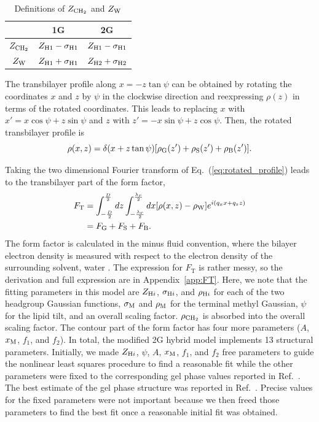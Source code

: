 \begin{table}[htbp]
  \centering
  \begin{tabular}{c c c}
    \hline
     & 1G & 2G \\
    \hline
    $Z_\mathrm{CH_2}$ & $Z_{\mathrm{H}1}-\sigma_{\mathrm{H}1}$ & $Z_{\mathrm{H}1}-\sigma_{\mathrm{H}1}$ \\
    $Z_\mathrm{W}$ & $Z_{\mathrm{H}1}+\sigma_{\mathrm{H}1}$ & $Z_{\mathrm{H}2}+\sigma_{\mathrm{H}2}$ \\
    \hline  
  \end{tabular}
  \caption{Definitions of $Z_\mathrm{CH_2}$ and $Z_\mathrm{W}$}
  \label{tab:zchtwozw}
\end{table}

The transbilayer profile along $x=-z\tan\psi$ can be obtained by rotating
the coordinates $x$ and $z$ by $\psi$ in the clockwise direction and
reexpressing $\rho(z)$ in terms of the rotated coordinates. This leads
to replacing $x$ with $x'=x\cos\psi+z\sin\psi$ and
$z$ with $z'=-x\sin\psi+z\cos\psi$. Then, the rotated transbilayer profile is
\begin{equation}
  \rho(x,z) = \delta(x+z\tan\psi)\mathopen{}\left[ \rho_\mathrm{G}(z') + \rho_\mathrm{S}(z') + \rho_\mathrm{B}(z') \right]\mathclose{}.
  \label{eq:rotated_profile}
\end{equation}

Taking the two dimensional Fourier transform of Eq.~(\ref{eq:rotated_profile})
leads to the transbilayer part of the form factor,
\begin{align}
  F_\mathrm{T} 
  &= \int_{-\frac{D}{2}}^{\frac{D}{2}}\mathop{dz}
     \int_{-\frac{\lambda_r}{2}}^{\frac{\lambda_r}{2}}\mathop{dx} 
     \mathopen{}\left[ \rho(x,z)-\rho_\mathrm{W} \right]\mathclose{} e^{i(q_xx+q_zz)} \\
  &= F_\mathrm{G} + F_\mathrm{S} + F_\mathrm{B}.
\end{align}
The form factor is calculated in the minus fluid convention, 
where the bilayer electron density
is measured with respect to the electron density of the surrounding solvent,
water \cite{ref:Worthington73}.
The expression for $F_\mathrm{T}$ is rather messy, so 
the derivation and full expression are in Appendix~\ref{app:FT}. Here, 
we note that
the fitting parameters in this model are $Z_{\mathrm{H}i}$, $\sigma_{\mathrm{H}i}$, and 
$\rho_{\mathrm{H}i}$ for each of the two headgroup Gaussian functions, $\sigma_\mathrm{M}$ and
$\rho_\mathrm{M}$ for
the terminal methyl Gaussian, $\psi$ for
the lipid tilt, and an overall scaling factor. $\rho_\mathrm{CH_2}$ is absorbed into 
the overall scaling factor. The contour part of the 
form factor has four more parameters ($A$, $x_\textrm{M}$, $f_1$, and $f_2$).
In total, the modified 2G hybrid model implements 13 structural parameters.
Initially, we made $Z_{\mathrm{H}i}$, $\psi$, $A$, $x_\textrm{M}$, $f_1$, and $f_2$ free 
parameters
to guide the nonlinear least squares procedure to find a reasonable fit
while the other parameters were fixed to the corresponding gel phase values 
reported in Ref.~\cite{ref:Wiener89}. 
The best estimate of the gel phase structure was reported in
Ref.~\cite{Tristram-Nagle02}. Precise values for the fixed parameters
were not important because we then freed those parameters to find the best fit
once a reasonable initial fit was obtained.  

